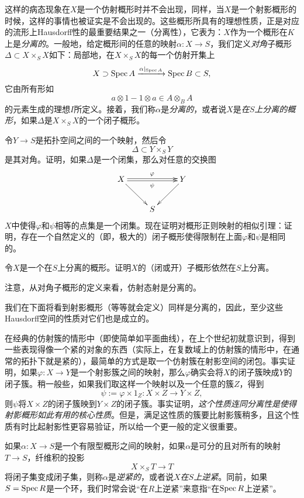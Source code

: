 这样的病态现象在$X$是一个仿射概形时并不会出现，同样，当$X$是一个射影概形的时候，这样的事情也被证实是不会出现的。这些概形所具有的理想性质，正是对应的流形上Hausdorff性的最重要结果之一（分离性），它表为：$X$作为一个概形在$K$上是\textit{分离的}。一般地，给定概形间的任意的映射$\alpha:X\to S$，我们定义\textit{对角}子概形$\Delta\subset X\times_S X$如下：局部地，在$X\times_S X$的每一个仿射开集上
\[
	X\supset \operatorname{Spec} A\xrightarrow{\alpha|_{\operatorname{Spec} A}}\operatorname{Spec} B\subset S,
\]
它由所有形如
\[
a\otimes 1 - 1\otimes a \in A\otimes_B A
\]
的元素生成的理想$I$所定义。接着，我们称$\alpha$是\textit{分离的}，或者说$X$是\textit{在$S$上分离的概形}，如果$\Delta$是$X\times_S X$的一个闭子概形。

\begin{exe}
令$Y\to S$是拓扑空间之间的一个映射，然后令
\[
	\Delta \subset Y\times_S Y
\]
是其对角。证明，如果$\Delta$是一个闭集，那么对任意的交换图
\[
	\xymatrix{
		X\ar@<0.3ex>[rr]^\varphi \ar@<-0.3ex>[rr]_\psi\ar[dr] &&Y\ar[ld]\\
		&S&
	}
\]
$X$中使得$\varphi$和$\psi$相等的点集是一个闭集。现在证明对概形正则映射的相似引理：证明，存在一个自然定义的（即，极大的）闭子概形使得限制在上面$\varphi$和$\psi$是相同的。
\end{exe}

\begin{exe}
	令$X$是一个在$S$上分离的概形。证明$X$的（闭或开）子概形依然在$S$上分离。
\end{exe}

\begin{exe}
	注意，从对角子概形的定义来看，仿射态射是分离的。
\end{exe}

我们在下面将看到射影概形（等等就会定义）同样是分离的，因此，至少这些Hausdorff空间的性质对它们也是成立的。

在经典的仿射簇的情形中（即使简单如平面曲线），在上个世纪初就意识到，得到一些表现得像一个紧的对象的东西（实际上，在复数域上的仿射簇的情形中，在通常的拓扑下就是紧的），最简单的方式是取一个仿射簇在射影空间的闭包。事实证明，如果$\varphi:X\to Y$是一个射影簇之间的映射，那么$\varphi$确实会将$X$的闭子簇映成$Y$的闭子簇。稍一般些，如果我们取这样一个映射以及一个任意的簇$Z$，得到
\[
	\psi:=\varphi\times 1_Z:X\times Z\to Y\times Z,
\]
则$\psi$将$X\times Z$的闭子簇映到$Y\times Z$的闭子簇。事实证明，\textit{这个性质连同分离性是使得射影概形如此有用的核心性质}。但是，满足这性质的簇要比射影簇稍多，且这个性质有时比起射影性更容易验证，所以给一个更一般的定义很重要。

如果$\alpha:X\to S$是一个有限型概形之间的映射，如果$\alpha$是可分的且对所有的映射$T\to S$，纤维积的投影
\[
	X\times_S T\to T
\]
将闭子集变成闭子集，则称$\alpha$是\textit{逆紧的}，或者说$X$\textit{在$S$上逆紧}。同前，如果$S=\operatorname{Spec} R$是一个环，我们时常会说“在$R$上逆紧”来意指“在$\operatorname{Spec} R$上逆紧”。

